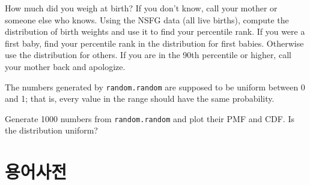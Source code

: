 \begin{exercise}
How much did you weigh at birth?  If you don't know, call your mother
or someone else who knows.  Using the NSFG data (all live births),
compute the distribution of birth weights and use it to find your
percentile rank.  If you were a first baby, find your percentile rank
in the distribution for first babies.  Otherwise use the distribution
for others.  If you are in the 90th percentile or higher, call your
mother back and apologize.

\end{exercise}

\begin{exercise}
The numbers generated by {\tt random.random} are supposed to be
uniform between 0 and 1; that is, every value in the range
should have the same probability.

Generate 1000 numbers from {\tt random.random} and plot their
PMF and CDF.  Is the distribution uniform?

\end{exercise}


\section{용어사전}

